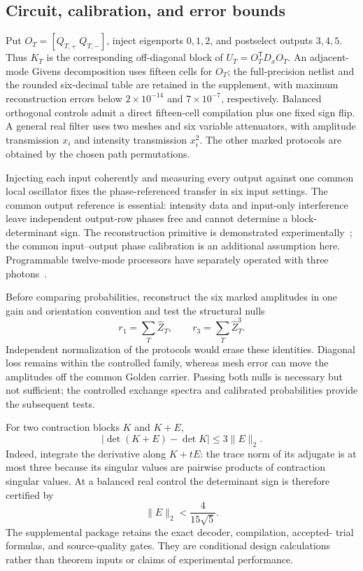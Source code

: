 \documentclass[11pt]{article}
\theoremstyle{remark}
\begin{document}
\subsection*{Circuit, calibration, and error bounds}

Put \(O_T=[Q_{T,+}\ Q_{T,-}]\), inject eigenports \(0,1,2\), and postselect
outputs \(3,4,5\).  Thus \(K_T\) is the corresponding off-diagonal block of
\(U_T=O_T^{\mathsf T}D_xO_T\).  An adjacent-mode Givens decomposition
uses fifteen cells for \(O_T\); the full-precision netlist and the rounded
six-decimal table are retained in the supplement, with maximum reconstruction
errors below \(2\times10^{-14}\) and \(7\times10^{-7}\), respectively.
Balanced orthogonal controls admit a direct fifteen-cell compilation plus one
fixed sign flip.  A general real filter uses two meshes and six variable
attenuators, with amplitude transmission \(x_i\) and intensity transmission
\(x_i^2\).  The other marked protocols are obtained by the chosen path
permutations.

Injecting each input coherently and measuring every output against one common
local oscillator fixes the phase-referenced transfer in six input settings.
The common output reference is essential: intensity data and input-only
interference leave independent output-row phases free and cannot determine a
block-determinant sign.  The reconstruction primitive is demonstrated
experimentally~\cite{RahimiKeshari}; the common input--output phase calibration
is an additional assumption here.  Programmable twelve-mode processors have
separately operated with three photons~\cite{Somhorst}.

Before comparing probabilities, reconstruct the six marked amplitudes in one
gain and orientation convention and test the structural nulls
\[
 r_1=\sum_T\widehat Z_T,\qquad r_3=\sum_T\widehat Z_T^3.
\]
Independent normalization of the protocols would erase these identities.
Diagonal loss remains within the controlled family, whereas mesh error can
move the amplitudes off the common Golden carrier.  Passing both nulls is
necessary but not sufficient; the controlled exchange spectra and calibrated
probabilities provide the subsequent tests.

For two contraction blocks \(K\) and \(K+E\),
\begin{equation}
\label{eq:determinant-stability}
 |\det(K+E)-\det K|\leq3\lVert E\rVert_2.
\end{equation}
Indeed, integrate the derivative along \(K+tE\): the trace norm of its
adjugate is at most three because its singular values are pairwise products of
contraction singular values.
\newpage
At a balanced real control the determinant sign
is therefore certified by
\[
 \lVert E\rVert_2<\frac{4}{15\sqrt5}.
\]
The supplemental package retains the exact decoder, compilation, accepted-
trial formulas, and source-quality gates.  They are conditional design
calculations rather than theorem inputs or claims of experimental performance.
\end{document}
